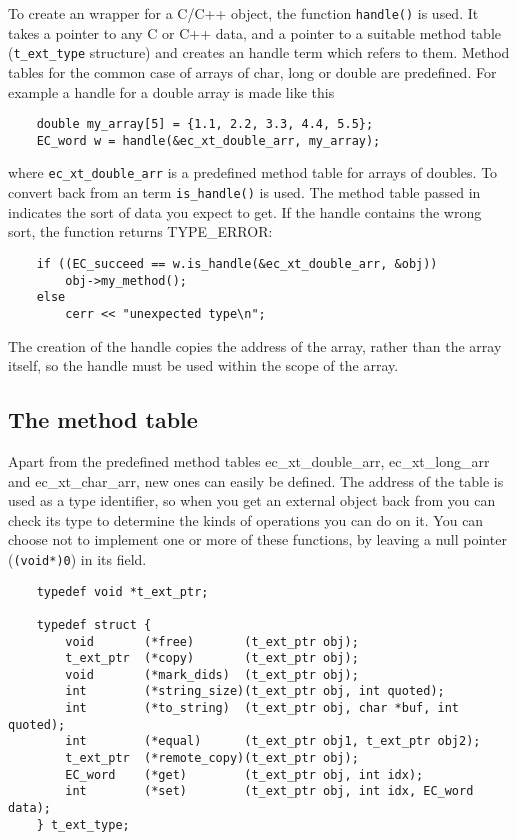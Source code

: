 To create an {\eclipse} wrapper for a C/C++ object,
the function \verb.handle(). is used. It takes a pointer to any C or C++
data, and a pointer to a suitable method table (\verb.t_ext_type. structure)
and creates an {\eclipse} handle term which refers to them.
Method tables for the common case of arrays of char, long or double
are predefined. For example a handle for a double array is made like this
\begin{verbatim}
    double my_array[5] = {1.1, 2.2, 3.3, 4.4, 5.5};
    EC_word w = handle(&ec_xt_double_arr, my_array);
\end{verbatim}
where \verb.ec_xt_double_arr. is a predefined method table for arrays of doubles.
To convert back from an {\eclipse} term \verb.is_handle(). is used.
The method table passed in indicates the sort of data you expect to get.
If the {\eclipse} handle contains the wrong sort, the function returns
TYPE_ERROR:
\begin{verbatim}
    if ((EC_succeed == w.is_handle(&ec_xt_double_arr, &obj))
        obj->my_method();
    else
        cerr << "unexpected type\n";
\end{verbatim}

The creation of the handle copies the address of the array, rather than the
array itself, so the handle must be used within the scope of the array.

\subsection{The method table}
Apart from the predefined method tables ec_xt_double_arr,
ec_xt_long_arr and ec_xt_char_arr, new ones can easily be defined.
The address of the table is used as a type identifier, so when you
get an external object back from {\eclipse} you can check its type
to determine the kinds of operations you can do on it.
You can choose not to implement one or more of these functions, by
leaving a null pointer (\verb.(void*)0.) in its field.

\begin{verbatim}
    typedef void *t_ext_ptr;

    typedef struct {
        void       (*free)       (t_ext_ptr obj);
        t_ext_ptr  (*copy)       (t_ext_ptr obj);
        void       (*mark_dids)  (t_ext_ptr obj);
        int        (*string_size)(t_ext_ptr obj, int quoted);
        int        (*to_string)  (t_ext_ptr obj, char *buf, int quoted);
        int        (*equal)      (t_ext_ptr obj1, t_ext_ptr obj2);
        t_ext_ptr  (*remote_copy)(t_ext_ptr obj);
        EC_word    (*get)        (t_ext_ptr obj, int idx);
        int        (*set)        (t_ext_ptr obj, int idx, EC_word data);
    } t_ext_type;
\end{verbatim}

